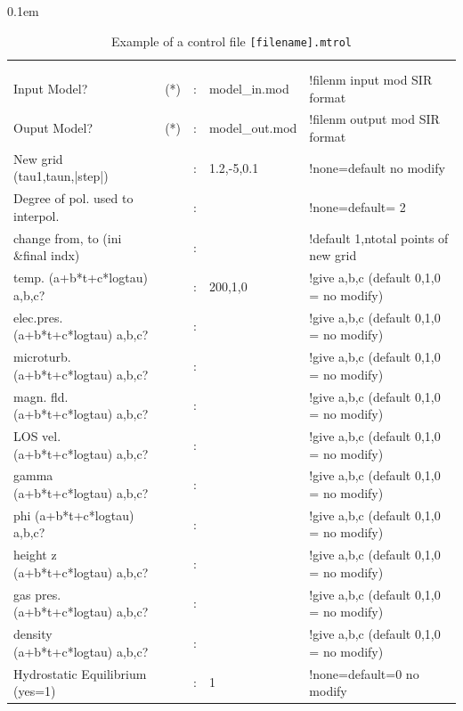 \begin{table}
\small
\tabcolsep 0.1em
\caption{Example of a control file {\tt [filename].mtrol} \protect \\ 
         }
\label{control}
\begin{tabular}{lrcll}
 &  & &            &       \\
 &  & &            &       \\

Input Model?                      &(*)&:& model\_in.mod  &!filenm input mod SIR format\\
Ouput Model?                      &(*)&:& model\_out.mod &!filenm output mod SIR format\\
New grid (tau1,taun,|step|)       &   &:& 1.2,-5,0.1     &!none=default no modify\\  
Degree of pol. used to interpol.  &   &:&                &!none=default= 2\\  
change from, to (ini \&final indx)&   &:&                &!default 1,ntotal points of new grid\\ 
temp. (a+b*t+c*logtau) a,b,c?     &   &:& 200,1,0        &!give a,b,c (default 0,1,0 = no modify)\\
elec.pres. (a+b*t+c*logtau) a,b,c?&   &:&                &!give a,b,c (default 0,1,0 = no modify)\\
microturb. (a+b*t+c*logtau) a,b,c?&   &:&                &!give a,b,c (default 0,1,0 = no modify)\\
magn. fld. (a+b*t+c*logtau) a,b,c?&   &:&                &!give a,b,c (default 0,1,0 = no modify)\\
LOS vel.   (a+b*t+c*logtau) a,b,c?&   &:&                &!give a,b,c (default 0,1,0 = no modify)\\
gamma (a+b*t+c*logtau) a,b,c?     &   &:&                &!give a,b,c (default 0,1,0 = no modify)\\
phi (a+b*t+c*logtau) a,b,c?       &   &:&                &!give a,b,c (default 0,1,0 = no modify)\\
height z (a+b*t+c*logtau) a,b,c?  &   &:&                &!give a,b,c (default 0,1,0 = no modify)\\
gas pres.(a+b*t+c*logtau) a,b,c?  &   &:&                &!give a,b,c (default 0,1,0 = no modify)\\
density (a+b*t+c*logtau) a,b,c?   &   &:&                &!give a,b,c (default 0,1,0 = no modify)\\
Hydrostatic Equilibrium (yes=1)   &   &:& 1              &!none=default=0 no modify\\

\end{tabular}
\end{table}

